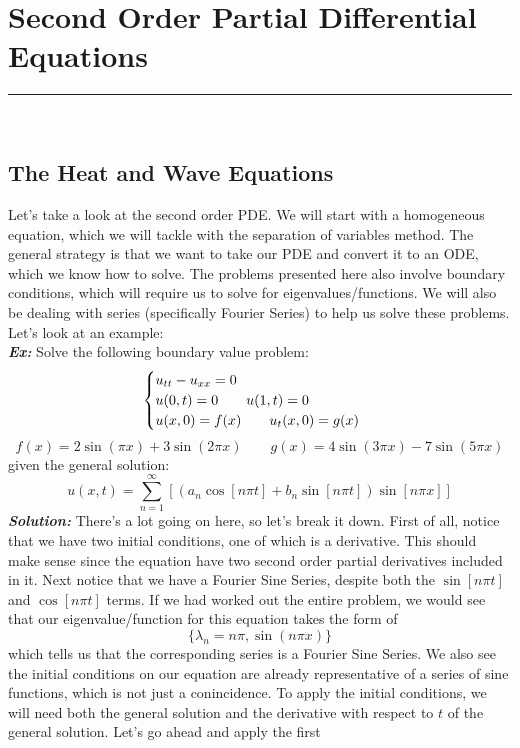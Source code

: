 \section{Second Order Partial Differential Equations}
\hrule
\noindent\\
\subsection{The Heat and Wave Equations}
\indent Let's take a look at the second order PDE. We will start with a
homogeneous equation, which we will tackle with the separation of variables
method. The general strategy is that we want to take our PDE and convert it to
an ODE, which we know how to solve. The problems presented here also involve
boundary conditions, which will require us to solve for eigenvalues/functions.
We will also be dealing with series (specifically Fourier Series) to help us
solve these problems. Let's look at an example:\\
\noindent\textbf{\textit{Ex:}} Solve the following boundary value problem:
\[
\begin{cases}
u_{tt} - u_{xx} = 0\\
u(0,t) = 0\qquad u(1,t) = 0\\
u(x,0) = f(x)\qquad u_{t}(x,0) = g(x)
\end{cases}\\
\]
\[f(x) = 2\sin{(\pi x)} + 3\sin{(2\pi x)}\qquad g(x) = 4\sin{(3\pi x)} - 7\sin{(5\pi x)}\]
given the general solution:
\[u(x,t) = \sum_{n=1}^{\infty}\left[\left(a_{n}\cos{[n\pi t]} + b_{n}\sin{[n\pi t]}\right)\sin{[n\pi
x]}\right]\]
\indent\textbf{\textit{Solution:}} There's a lot going on here, so let's break
it down. First of all, notice that we have two initial conditions, one of which
is a derivative. This should make sense since the equation have two second order
partial derivatives included in it. Next notice that we have a Fourier Sine Series,
despite both the $\sin{[n\pi t]}$ and $\cos{[n\pi t]}$ terms. If we had worked
out the entire problem, we would see that our eigenvalue/function for this
equation takes the form of
\[
\{\lambda_{n} = n\pi, \sin{(n\pi x)}\}
\]
\noindent which tells us that the corresponding series is a Fourier Sine Series.
We also see the initial conditions on our equation are already representative
of a series of sine functions, which is not just a conincidence. To apply the
initial conditions, we will need both the general solution and the derivative
with respect to $t$ of the general solution. Let's go ahead and apply the first
